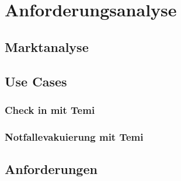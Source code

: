 \chapter{Anforderungsanalyse}
\label{chap:anforderungsanalyse}
\section{Marktanalyse}
\label{sec:marktanalyse}
\section{Use Cases}
\subsection{Check in mit Temi}
\subsection{Notfallevakuierung mit Temi}
\section{Anforderungen}
